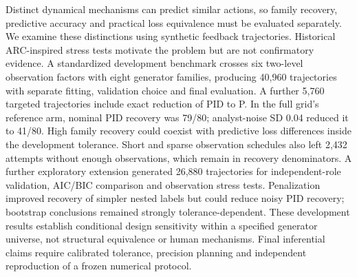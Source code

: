 Distinct dynamical mechanisms can predict similar actions, so family recovery, predictive accuracy and practical loss equivalence must be evaluated separately. We examine these distinctions using synthetic feedback trajectories. Historical ARC-inspired stress tests motivate the problem but are not confirmatory evidence. A standardized development benchmark crosses six two-level observation factors with eight generator families, producing 40,960 trajectories with separate fitting, validation choice and final evaluation. A further 5,760 targeted trajectories include exact reduction of PID to P. In the full grid's reference arm, nominal PID recovery was 79/80; analyst-noise SD 0.04 reduced it to 41/80. High family recovery could coexist with predictive loss differences inside the development tolerance. Short and sparse observation schedules also left 2,432 attempts without enough observations, which remain in recovery denominators. A further exploratory extension generated 26,880 trajectories for independent-role validation, AIC/BIC comparison and observation stress tests. Penalization improved recovery of simpler nested labels but could reduce noisy PID recovery; bootstrap conclusions remained strongly tolerance-dependent. These development results establish conditional design sensitivity within a specified generator universe, not structural equivalence or human mechanisms. Final inferential claims require calibrated tolerance, precision planning and independent reproduction of a frozen numerical protocol.
